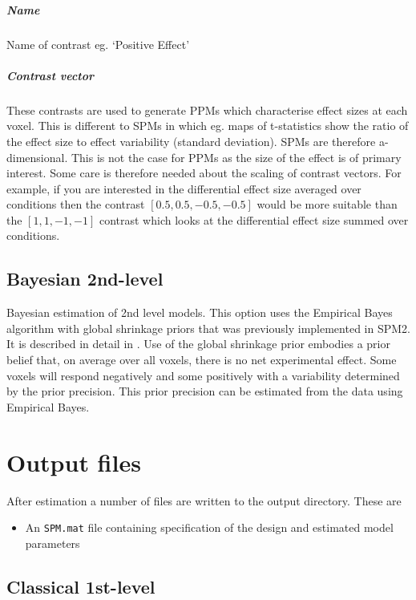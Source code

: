 \subparagraph{Name}
Name of contrast eg. `Positive Effect'


\subparagraph{Contrast vector}
These contrasts are used to generate PPMs which characterise effect sizes at each voxel. This is different to SPMs in which eg. maps of t-statistics show the ratio of the effect size to effect variability (standard deviation). SPMs are therefore a-dimensional. This is not the case for PPMs as the size of the effect is of primary interest. Some care is therefore needed about the scaling of contrast vectors. For example, if you are interested in the differential effect size averaged over conditions then the contrast $[0.5, 0.5, -0.5, -0.5]$ would be more suitable than the $[1, 1, -1, -1]$ contrast which looks at the differential effect size summed over conditions. 


\subsection{Bayesian 2nd-level}
Bayesian estimation of 2nd level models. This option uses the Empirical Bayes algorithm with global shrinkage priors that was previously implemented in SPM2. It is described in detail in \cite{karl_posterior}.
Use of the global shrinkage prior embodies a prior belief that, on average over all voxels, there is no net experimental effect. Some voxels will respond negatively and some positively with a variability determined by the prior precision. This prior precision can be estimated from the data using Empirical Bayes. 

\section{Output files}

After estimation a number of files are written to the
output directory. These are
\begin{itemize}
\item{An \verb!SPM.mat! file containing specification of the design and estimated model parameters}
\end{itemize}

\subsection{Classical 1st-level}

